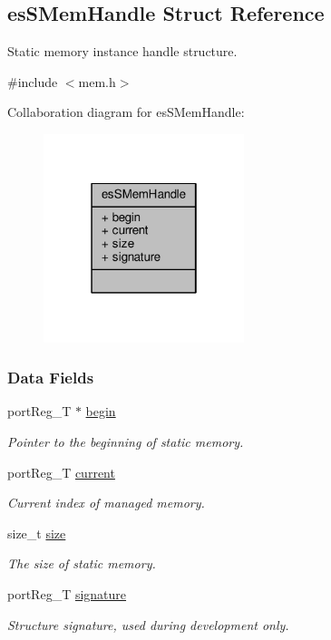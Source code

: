 \hypertarget{structesSMemHandle}{\subsection{es\-S\-Mem\-Handle Struct Reference}
\label{structesSMemHandle}
}


Static memory instance handle structure.  




{\ttfamily \#include $<$mem.\-h$>$}



Collaboration diagram for es\-S\-Mem\-Handle\-:\nopagebreak
\begin{figure}[H]
\begin{center}
\leavevmode
\includegraphics[width=166pt]{structesSMemHandle__coll__graph}
\end{center}
\end{figure}
\subsubsection*{Data Fields}
\begin{DoxyCompactItemize}
\item 
port\-Reg\-\_\-\-T $\ast$ \hyperlink{structesSMemHandle_a01da81c99962c4e30bc5286a95e1c912}{begin}
\begin{DoxyCompactList}\small\item\em Pointer to the beginning of static memory. \end{DoxyCompactList}\item 
port\-Reg\-\_\-\-T \hyperlink{structesSMemHandle_a2ffccb4ce219c893b0de4bb277a4103d}{current}
\begin{DoxyCompactList}\small\item\em Current index of managed memory. \end{DoxyCompactList}\item 
size\-\_\-t \hyperlink{structesSMemHandle_a9f70491a315a88d0e01edc29e87da9b0}{size}
\begin{DoxyCompactList}\small\item\em The size of static memory. \end{DoxyCompactList}\item 
port\-Reg\-\_\-\-T \hyperlink{structesSMemHandle_a026a8283657eb726a0c9c559e455153a}{signature}
\begin{DoxyCompactList}\small\item\em Structure signature, used during development only. \end{DoxyCompactList}\end{DoxyCompactItemize}


